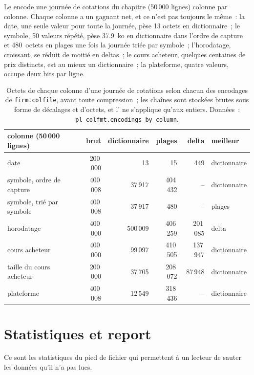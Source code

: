 Le  encode une journée de cotations du chapitre (50\,000 lignes) colonne par colonne. Chaque colonne
a un gagnant net, et ce n'est pas toujours le même~: la date, une seule valeur pour toute la journée, pèse 13 octets en dictionnaire~; le symbole, 50 valeurs
répété, pèse 37.9~ko en dictionnaire dans l'ordre de capture et 480~octets en plages une fois la journée triée par symbole~; l'horodatage,
croissant, se réduit de moitié en deltas~; le cours acheteur, quelques centaines de prix distincts, est au mieux un dictionnaire~; la plateforme, quatre valeurs, occupe deux
bits par ligne.

\begin{table}[ht]
\centering\small
\begin{tabular}{lrrrrl}
\toprule
colonne (50\,000 lignes) & brut & dictionnaire & plages & delta & meilleur \\
\midrule
date & 200\,000 & 13 & 15 & 449 & dictionnaire \\
symbole, ordre de capture & 400\,008 & 37\,917 & 404\,432 & -- & dictionnaire \\
symbole, trié par symbole & 400\,008 & 37\,917 & 480 & -- & plages \\
horodatage & 400\,000 & 500\,009 & 406\,259 & 201\,085 & delta \\
cours acheteur & 400\,000 & 99\,097 & 410\,505 & 137\,947 & dictionnaire \\
taille du cours acheteur & 200\,000 & 37\,705 & 208\,072 & 87\,948 & dictionnaire \\
plateforme & 400\,008 & 12\,549 & 318\,436 & -- & dictionnaire \\
\bottomrule
\end{tabular}
\caption{Octets de chaque colonne d'une journée de cotations selon chacun des encodages de \texttt{firm.colfile}, avant toute compression~;
les chaînes sont stockées brutes sous forme de décalages et d'octets, et l' ne s'applique qu'aux entiers. Données~:
\texttt{pl\_colfmt.encodings\_by\_column}.}\label{tab:pl:columnar-formats:encodings}
\end{table}

\section{Statistiques et report}

Ce sont les statistiques du pied de fichier qui permettent à un lecteur de sauter les données qu'il n'a pas lues.

